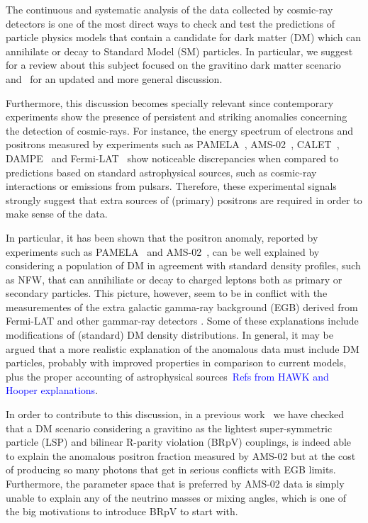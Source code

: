 \documentclass[a4paper,11pt]{article}
\newcommand*{\blue}{\textcolor{blue}}
\begin{document}
The continuous and systematic analysis of the data collected by cosmic-ray detectors is one of the most direct ways to check and test the predictions of particle physics models that contain a candidate for dark matter (DM) which can annihilate or decay to Standard Model (SM) particles. In particular, we suggest~\cite{Grefe:2011dp} for a review about this subject focused on the gravitino dark matter scenario and~\cite{Hooper:2018kfv} for an updated and more general discussion. 

Furthermore, this discussion becomes specially relevant since contemporary experiments show the presence of persistent and striking anomalies concerning the detection of cosmic-rays. For instance, the energy spectrum of electrons and positrons measured by experiments such as PAMELA~\cite{Adriani:2008zr}, AMS-02~\cite{Accardo:2014lma,Aguilar:2014mma,Aguilar:2014fea}, CALET~\cite{Adriani:2018ktz}, DAMPE~\cite{Ambrosi:2017wek} and Fermi-LAT~\cite{Ackermann:2014usa} show noticeable discrepancies when compared to predictions based on standard astrophysical sources, such as cosmic-ray interactions or emissions from pulsars. Therefore, these experimental signals strongly suggest that extra sources of (primary) positrons are required in order to make sense of the data. 

In particular, it has been shown that the positron anomaly, reported by experiments such as PAMELA~\cite{Adriani:2008zr} and AMS-02~\cite{Accardo:2014lma}, can be well explained by considering a population of DM in agreement with standard density profiles, such as NFW, that can annihiliate or decay to charged leptons both as primary or secondary particles. This picture, however, seem to be in conflict with the measurementes of the extra galactic gamma-ray background (EGB) derived from Fermi-LAT and other gammar-ray detectors \cite{Grefe:2008zz,2012PhRvD..86h3506C,Ando:2015qda,Laletin:2016egv,Liu:2016ngs,Belotsky:2016tja}. Some of these explanations include modifications of (standard) DM density distributions. In general, it may be argued that a more realistic explanation of the anomalous data must include DM particles, probably with improved properties in comparison to current models, plus the proper accounting of astrophysical sources~\blue{Refs from HAWK and Hooper explanations}.

In order to contribute to this discussion, in a previous work~\cite{Carquin:2015uma} we have checked that a DM scenario considering a gravitino as the lightest super-symmetric particle (LSP) and bilinear R-parity violation (BRpV) couplings, is indeed able to explain the anomalous positron fraction measured by AMS-02 but at the cost of producing so many photons that get in serious conflicts with EGB limits. Furthermore, the parameter space that is preferred by  AMS-02 data is simply unable to explain any of the neutrino masses or mixing angles, which is one of the big motivations to introduce BRpV to start with.
\end{document}
